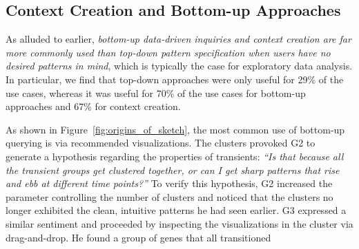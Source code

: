 \subsection{Context Creation and Bottom-up Approaches}
\par As alluded to earlier, 
\emph{bottom-up data-driven inquiries 
and context creation are far more commonly 
used than top-down pattern specification 
when users have no desired patterns in mind}, 
which is typically the case for exploratory data analysis. 
In particular, we find that top-down approaches 
were only useful for 29\% of the use cases, 
whereas it was useful for 70\% of the use cases 
for bottom-up approaches and 67\% 
for context creation. 
\par As shown in Figure~\ref{fig:origins_of_sketch}, 
the most common use of bottom-up querying 
is via recommended visualizations. 
 The clusters provoked G2 to generate a hypothesis 
regarding the properties of transients: 
\textit{``Is that because all the transient groups 
get clustered together, or can I get sharp patterns 
that rise and ebb at different time points?''} 
To verify this hypothesis, G2 increased the parameter controlling the number of clusters and noticed that the clusters
no longer exhibited the clean, 
intuitive patterns he had seen earlier. 
G3 expressed a similar sentiment and proceeded 
by inspecting the visualizations 
in the cluster via drag-and-drop. 
He found a group of genes that all transitioned 
